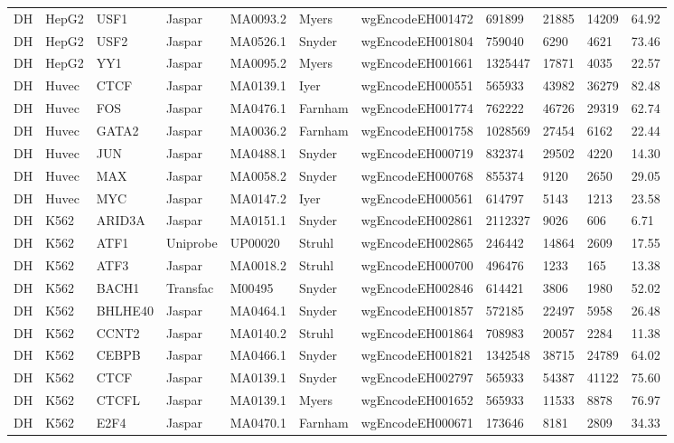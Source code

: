 {\begin{longtable}{p{0.2cm}p{1.1cm}p{1.0cm}p{1.0cm}p{1.0cm}p{1.0cm}p{2.3cm}p{1.0cm}p{0.8cm}p{0.8cm}p{0.8cm}}
DH & HepG2 & USF1 & Jaspar & MA0093.2 & Myers & wgEncodeEH001472 & 691899 & 21885 & 14209 & 64.92\\
DH & HepG2 & USF2 & Jaspar & MA0526.1 & Snyder & wgEncodeEH001804 & 759040 & 6290 & 4621 & 73.46\\
DH & HepG2 & YY1 & Jaspar & MA0095.2 & Myers & wgEncodeEH001661 & 1325447 & 17871 & 4035 & 22.57\\
DH & Huvec & CTCF & Jaspar & MA0139.1 & Iyer & wgEncodeEH000551 & 565933 & 43982 & 36279 & 82.48\\
DH & Huvec & FOS & Jaspar & MA0476.1 & Farnham & wgEncodeEH001774 & 762222 & 46726 & 29319 & 62.74\\
DH & Huvec & GATA2 & Jaspar & MA0036.2 & Farnham & wgEncodeEH001758 & 1028569 & 27454 & 6162 & 22.44\\
DH & Huvec & JUN & Jaspar & MA0488.1 & Snyder & wgEncodeEH000719 & 832374 & 29502 & 4220 & 14.30\\
DH & Huvec & MAX & Jaspar & MA0058.2 & Snyder & wgEncodeEH000768 & 855374 & 9120 & 2650 & 29.05\\
DH & Huvec & MYC & Jaspar & MA0147.2 & Iyer & wgEncodeEH000561 & 614797 & 5143 & 1213 & 23.58\\
DH & K562 & ARID3A & Jaspar & MA0151.1 & Snyder & wgEncodeEH002861 & 2112327 & 9026 & 606 & 6.71\\
DH & K562 & ATF1 & Uniprobe & UP00020 & Struhl & wgEncodeEH002865 & 246442 & 14864 & 2609 & 17.55\\
DH & K562 & ATF3 & Jaspar & MA0018.2 & Struhl & wgEncodeEH000700 & 496476 & 1233 & 165 & 13.38\\
DH & K562 & BACH1 & Transfac & M00495 & Snyder & wgEncodeEH002846 & 614421 & 3806 & 1980 & 52.02\\
DH & K562 & BHLHE40 & Jaspar & MA0464.1 & Snyder & wgEncodeEH001857 & 572185 & 22497 & 5958 & 26.48\\
DH & K562 & CCNT2 & Jaspar & MA0140.2 & Struhl & wgEncodeEH001864 & 708983 & 20057 & 2284 & 11.38\\
DH & K562 & CEBPB & Jaspar & MA0466.1 & Snyder & wgEncodeEH001821 & 1342548 & 38715 & 24789 & 64.02\\
DH & K562 & CTCF & Jaspar & MA0139.1 & Snyder & wgEncodeEH002797 & 565933 & 54387 & 41122 & 75.60\\
DH & K562 & CTCFL & Jaspar & MA0139.1 & Myers & wgEncodeEH001652 & 565933 & 11533 & 8878 & 76.97\\
DH & K562 & E2F4 & Jaspar & MA0470.1 & Farnham & wgEncodeEH000671 & 173646 & 8181 & 2809 & 34.33\\

\end{longtable}}
